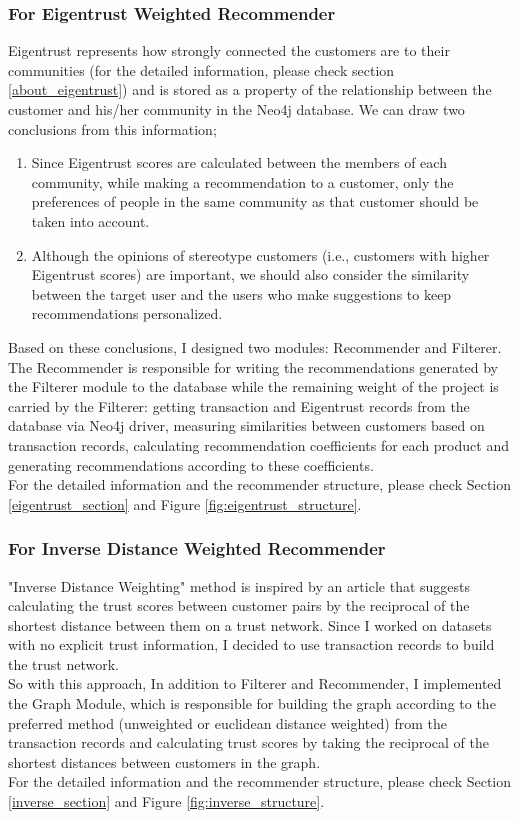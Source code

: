 \subsubsection{For Eigentrust Weighted Recommender}
Eigentrust represents how strongly connected the customers are to their communities (for the detailed information, please check section \ref{about_eigentrust}) and is stored as a property of the relationship between the customer and his/her community in the Neo4j database. We can draw two conclusions from this information;
\begin{enumerate}
	\item Since Eigentrust scores are calculated between the members of each community, while making a recommendation to a customer, only the preferences of people in the same community as that customer should be taken into account.
	\item Although the opinions of stereotype customers (i.e., customers with higher Eigentrust scores) are important, we should also consider the similarity between the target user and the users who make suggestions to keep recommendations personalized.
\end{enumerate}
Based on these conclusions, I designed two modules: Recommender and Filterer. The Recommender is responsible for writing the recommendations generated by the Filterer module to the database while the remaining weight of the project is carried by the Filterer: getting transaction and Eigentrust records from the database via Neo4j driver, measuring similarities between customers based on transaction records, calculating recommendation coefficients for each product and generating recommendations according to these coefficients. \\

For the detailed information and the recommender structure, please check Section \ref{eigentrust_section} and Figure \ref{fig:eigentrust_structure}.
\subsubsection{For Inverse Distance Weighted Recommender}
"Inverse Distance Weighting" method is inspired by an article\cite{inverse_article} that suggests calculating the trust scores between customer pairs by the reciprocal of the shortest distance between them on a trust network. Since I worked on datasets with no explicit trust information, I decided to use transaction records to build the trust network. \\

So with this approach, In addition to Filterer and Recommender, I implemented the Graph Module, which is responsible for building the graph according to the preferred method (unweighted or euclidean distance weighted) from the transaction records and calculating trust scores by taking the reciprocal of the shortest distances between customers in the graph. \\

For the detailed information and the recommender structure, please check Section \ref{inverse_section} and Figure \ref{fig:inverse_structure}.